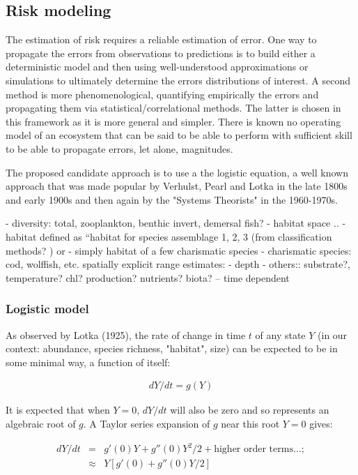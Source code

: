 \documentclass[letterpaper,portrait,11pt]{scrartcl}
\numberwithin{equation}{section}		%
\numberwithin{figure}{section}		%
\numberwithin{table}{section}				%
\begin{document}
\subsection{Risk modeling}
\label{sec:riskapproach}

The estimation of risk requires a reliable estimation of error. One way to propagate the errors from observations to predictions is to build either a deterministic model and then using well-understood approximations or simulations to ultimately determine the errors distributions of interest. A second method is more phenomenological, quantifying empirically the errors and propagating them via statistical/correlational methods. The latter is chosen in this framework as it is more general and simpler. There is known no operating model of an ecosystem that can be said to be able to perform with sufficient skill to be able to propagate errors, let alone, magnitudes. 

The proposed candidate approach is to use a the logistic equation, a well known approach that was made popular by Verhulst, Pearl and Lotka in the late 1800s and early 1900s and then again by the "Systems Theorists" in the 1960-1970s.  

- diversity: total, zooplankton, benthic invert, demersal fish?
- habitat space ..
- habitat defined as {``}habitat for species assemblage 1, 2, 3 (from classification methods? ) or
- simply habitat of a few charismatic species
- charismatic species: cod, wolffish, etc.
	spatially explicit range estimates:
- depth
- others:: substrate?, temperature? chl? production? nutrients? biota? -- time dependent


\subsubsection{Logistic model}

As observed by Lotka (1925), the rate of change in time $t$ of any state $Y$ (in our context: abundance, species richness, "habitat", size) can be expected to be in some minimal way, a function of itself:  

\begin{eqnarray} 
\label{eqLogisticContinuous}
dY / dt = g(Y)
\end{eqnarray}

It is expected that when $Y = 0$, $dY/dt$ will also be zero and so represents an algebraic root of $g$. A Taylor series expansion of $g$ near this root $Y=0$ gives:

\begin{eqnarray*} 
  \label{eqLogisticTaylorSeries}
  dY / dt &=&  g'(0) Y + g''(0) Y^{2}/2  + \text{higher order terms} \dots; \\
  &\approx& Y [g'(0) + g''(0) Y/2  ]
\end{eqnarray*}
\end{document}

